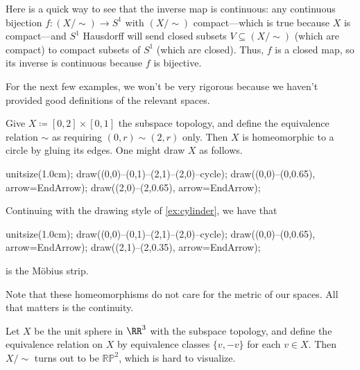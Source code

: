 \documentclass[../notes.tex]{subfiles}
\begin{document}
\begin{remark}[Nir]
	Here is a quick way to see that the inverse map is continuous: any continuous bijection $f\colon(X/{\sim})\to S^1$ with $(X/{\sim})$ compact---which is true because $X$ is compact---and $S^1$ Hausdorff will send closed subsets $V\subseteq(X/{\sim})$ (which are compact) to compact subsets of $S^1$ (which are closed). Thus, $f$ is a closed map, so its inverse is continuous because $f$ is bijective.
\end{remark}
For the next few examples, we won't be very rigorous because we haven't provided good definitions of the relevant spaces.
\begin{ex} \label{ex:cylinder}
	Give $X\coloneqq[0,2]\times[0,1]$ the subspace topology, and define the equivalence relation $\sim$ as requiring $(0,r)\sim(2,r)$ only. Then $X$ is homeomorphic to a circle by gluing its edges. One might draw $X$ as follows.
	\begin{center}
		\begin{asy}
			unitsize(1.0cm);
			draw((0,0)--(0,1)--(2,1)--(2,0)--cycle);
			draw((0,0)--(0,0.65), arrow=EndArrow);
			draw((2,0)--(2,0.65), arrow=EndArrow);
		\end{asy}
	\end{center}
\end{ex}
\begin{example}
	Continuing with the drawing style of \autoref{ex:cylinder}, we have that
	\begin{center}
		\begin{asy}
			unitsize(1.0cm);
			draw((0,0)--(0,1)--(2,1)--(2,0)--cycle);
			draw((0,0)--(0,0.65), arrow=EndArrow);
			draw((2,1)--(2,0.35), arrow=EndArrow);
		\end{asy}
	\end{center}
	is the M\"obius strip.
\end{example}
\begin{remark}
	Note that these homeomorphisms do not care for the metric of our spaces. All that matters is the continuity.
\end{remark}
\begin{example}
	Let $X$ be the unit sphere in $\RR^3$ with the subspace topology, and define the equivalence relation on $X$ by equivalence classes $\{v,-v\}$ for each $v\in X$. Then $X/{\sim}$ turns out to be $\mathbb{RP}^2$, which is hard to visualize.
\end{example}
\end{document}
